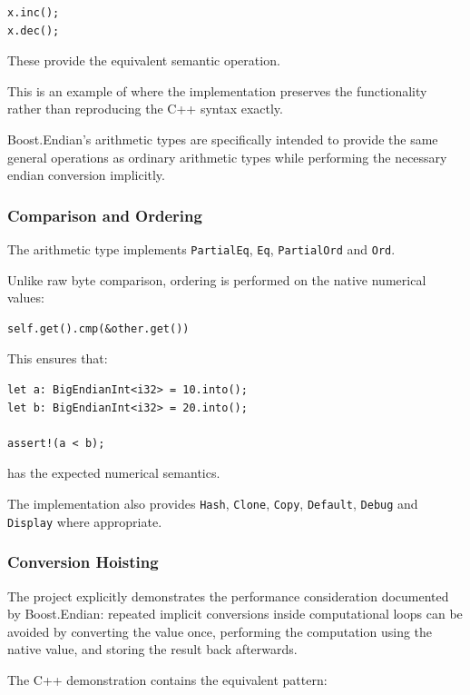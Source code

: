 \begin{lstlisting}[style=rustblock]
x.inc();
x.dec();
\end{lstlisting}

These provide the equivalent semantic operation.

This is an example of where the implementation preserves the functionality rather than reproducing the C++ syntax 
exactly.

Boost.Endian's arithmetic types are specifically intended to provide the same general operations as ordinary 
arithmetic types while performing the necessary endian conversion implicitly.

\subsubsection{Comparison and Ordering}

The arithmetic type implements \texttt{PartialEq}, \texttt{Eq}, \texttt{PartialOrd} and \texttt{Ord}.

Unlike raw byte comparison, ordering is performed on the native numerical values:

\begin{lstlisting}[style=rustblock]
self.get().cmp(&other.get())
\end{lstlisting}

This ensures that:

\begin{lstlisting}[style=rustblock]
let a: BigEndianInt<i32> = 10.into();
let b: BigEndianInt<i32> = 20.into();

assert!(a < b);
\end{lstlisting}

has the expected numerical semantics.

The implementation also provides \texttt{Hash}, \texttt{Clone}, \texttt{Copy}, \texttt{Default}, \texttt{Debug} and \texttt{Display} 
where appropriate.

\subsubsection{Conversion Hoisting}

The project explicitly demonstrates the performance consideration documented by Boost.Endian: repeated implicit 
conversions inside computational loops can be avoided by converting the value once, performing the computation using 
the native value, and storing the result back afterwards.

The C++ demonstration contains the equivalent pattern:

